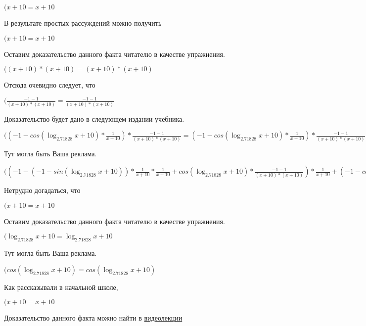 \documentclass[12pt,a4paper,fleqn]{article}
\theoremstyle{definition}
\begin{document}
$( x  +  10  =  x  +  10 $

В результате простых рассуждений можно получить

$( x  +  10  =  x  +  10 $

Оставим доказательство данного факта читателю в качестве упражнения.

$(( x  +  10 ) * ( x  +  10 ) = ( x  +  10 ) * ( x  +  10 )$

Отсюда очевидно следует, что

$(\frac{ -1  -  1 }{( x  +  10 ) * ( x  +  10 )}
 = \frac{ -1  -  1 }{( x  +  10 ) * ( x  +  10 )}
$

Доказательство будет дано в следующем издании учебника.

$(( -1  - cos(\log_{ 2.71828 }{ x  +  10 }) * \frac{ 1 }{ x  +  10 }
) * \frac{ -1  -  1 }{( x  +  10 ) * ( x  +  10 )}
 = ( -1  - cos(\log_{ 2.71828 }{ x  +  10 }) * \frac{ 1 }{ x  +  10 }
) * \frac{ -1  -  1 }{( x  +  10 ) * ( x  +  10 )}
$

Тут могла быть Ваша реклама.

$(( -1  - ( -1  - sin(\log_{ 2.71828 }{ x  +  10 })) * \frac{ 1 }{ x  +  10 }
 * \frac{ 1 }{ x  +  10 }
 + cos(\log_{ 2.71828 }{ x  +  10 }) * \frac{ -1  -  1 }{( x  +  10 ) * ( x  +  10 )}
) * \frac{ 1 }{ x  +  10 }
 + ( -1  - cos(\log_{ 2.71828 }{ x  +  10 }) * \frac{ 1 }{ x  +  10 }
) * \frac{ -1  -  1 }{( x  +  10 ) * ( x  +  10 )}
 = ( -1  - ( -1  - sin(\log_{ 2.71828 }{ x  +  10 })) * \frac{ 1 }{ x  +  10 }
 * \frac{ 1 }{ x  +  10 }
 + cos(\log_{ 2.71828 }{ x  +  10 }) * \frac{ -1  -  1 }{( x  +  10 ) * ( x  +  10 )}
) * \frac{ 1 }{ x  +  10 }
 + ( -1  - cos(\log_{ 2.71828 }{ x  +  10 }) * \frac{ 1 }{ x  +  10 }
) * \frac{ -1  -  1 }{( x  +  10 ) * ( x  +  10 )}
$

Нетрудно догадаться, что

$( x  +  10  =  x  +  10 $

Оставим доказательство данного факта читателю в качестве упражнения.

$(\log_{ 2.71828 }{ x  +  10 } = \log_{ 2.71828 }{ x  +  10 }$

Тут могла быть Ваша реклама.

$(cos(\log_{ 2.71828 }{ x  +  10 }) = cos(\log_{ 2.71828 }{ x  +  10 })$

Как рассказывали в начальной школе,

$( x  +  10  =  x  +  10 $

Доказательство данного факта можно найти в \href{https://www.youtube.com/watch?v=dQw4w9WgXcQ}{видеолекции}
\end{document}
